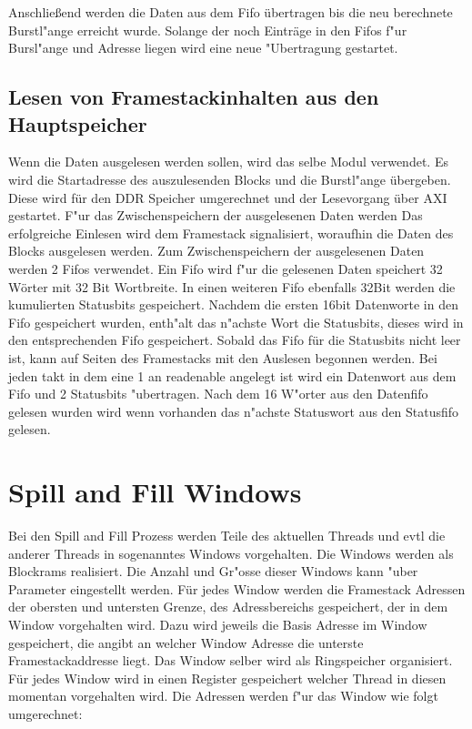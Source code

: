Anschlie{\ss}end werden die Daten aus dem Fifo \"ubertragen bis die neu berechnete Burstl"ange erreicht wurde. Solange der noch Eintr\"age in den Fifos f"ur Bursl"ange und Adresse liegen wird eine neue "Ubertragung gestartet. 


\subsection{Lesen von Framestackinhalten aus den Hauptspeicher}
Wenn die Daten ausgelesen werden sollen, wird das selbe Modul verwendet. Es wird die Startadresse des auszulesenden Blocks und die Burstl"ange \"ubergeben. Diese wird f\"ur den DDR Speicher umgerechnet und der Lesevorgang \"uber AXI gestartet. F"ur das Zwischenspeichern der ausgelesenen Daten werden  Das erfolgreiche Einlesen wird dem Framestack signalisiert, woraufhin die Daten des Blocks ausgelesen werden. Zum Zwischenspeichern der ausgelesenen Daten werden 2 Fifos verwendet. Ein Fifo wird f"ur die gelesenen Daten speichert 32 Wörter mit 32 Bit Wortbreite. In einen weiteren Fifo ebenfalls 32Bit werden die kumulierten Statusbits gespeichert. Nachdem die ersten 16bit Datenworte in den Fifo gespeichert wurden, enth"alt das n"achste Wort die Statusbits, dieses wird in den entsprechenden Fifo gespeichert. Sobald das Fifo für die Statusbits nicht leer ist, kann auf Seiten des Framestacks mit den Auslesen begonnen werden. Bei jeden takt in dem eine 1 an readenable angelegt ist wird ein Datenwort aus dem Fifo und 2 Statusbits "ubertragen. Nach dem 16 W"orter aus den Datenfifo gelesen wurden wird wenn vorhanden das n"achste Statuswort aus den Statusfifo gelesen. 



\section{Spill and Fill Windows}

Bei den Spill and Fill Prozess werden Teile des aktuellen Threads  und evtl die anderer Threads in sogenanntes Windows vorgehalten. Die Windows werden als Blockrams realisiert. 
Die Anzahl und Gr"o{ss}e dieser Windows kann "uber Parameter eingestellt werden. Für jedes Window werden die Framestack Adressen der obersten und untersten Grenze, des Adressbereichs gespeichert, der in dem Window vorgehalten wird. Dazu wird jeweils die Basis Adresse im Window gespeichert, die angibt an welcher Window Adresse die unterste Framestackaddresse liegt. 
Das Window selber wird als Ringspeicher organisiert. Für jedes Window wird in einen Register gespeichert welcher Thread in diesen momentan vorgehalten wird. 
Die Adressen werden f"ur das Window wie folgt umgerechnet:

